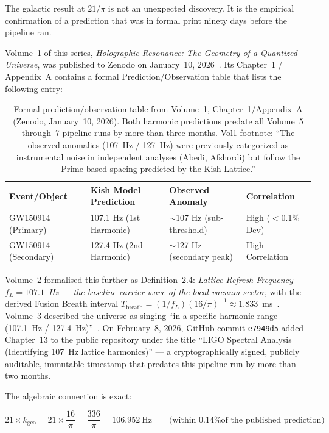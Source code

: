 \documentclass[11pt, letterpaper, openany]{book}
\begin{document}
The galactic result at $21/\pi$ is not an unexpected discovery. It is the empirical
confirmation of a prediction that was in formal print ninety days before the pipeline
ran.

Volume~1 of this series, \textit{Holographic Resonance: The Geometry of a Quantized
Universe}, was published to Zenodo on January~10, 2026~\cite{kish2026vol1}. Its
Chapter~1 / Appendix~A contains a formal Prediction/Observation table that lists the
following entry:

\begin{table}[H]
\centering
\renewcommand{\arraystretch}{1.3}
\begin{tabular}{|l|l|l|l|}
\hline
\rowcolor{goldseal!15}
\textbf{Event/Object} & \textbf{Kish Model Prediction} & \textbf{Observed Anomaly} & \textbf{Correlation} \\
\hline\hline
GW150914 (Primary)   & 107.1 Hz (1st Harmonic) & $\sim$107 Hz (sub-threshold) & High ($<$0.1\% Dev) \\
GW150914 (Secondary) & 127.4 Hz (2nd Harmonic) & $\sim$127 Hz (secondary peak) & High Correlation \\
\hline
\end{tabular}
\caption{Formal prediction/observation table from Volume~1, Chapter~1/Appendix~A
(Zenodo, January~10, 2026). Both harmonic predictions predate all Volume~5 through~7
pipeline runs by more than three months. Vol1 footnote: ``The observed anomalies
(107~Hz / 127~Hz) were previously categorized as instrumental noise in independent
analyses (Abedi, Afshordi) but follow the Prime-based spacing predicted by the
Kish Lattice.''}
\label{tab:vol1_prediction}
\end{table}

Volume~2 formalised this further as Definition~2.4: \textit{Lattice Refresh Frequency
$f_L = 107.1$~Hz --- the baseline carrier wave of the local vacuum sector}, with the
derived Fusion Breath interval $T_\text{breath} = (1/f_L)(16/\pi)^{-1} \approx
1.833$~ms~\cite{kish2026vol2}. Volume~3 described the universe as singing ``in a
specific harmonic range (107.1~Hz / 127.4~Hz)''~\cite{kish2026vol3}. On February~8,
2026, GitHub commit \texttt{e7949d5} added Chapter~13 to the public repository under
the title ``LIGO Spectral Analysis (Identifying 107~Hz lattice harmonics)'' ---
a cryptographically signed, publicly auditable, immutable timestamp that predates
this pipeline run by more than two months.

The algebraic connection is exact:

\[
21 \times k_\text{geo} = 21 \times \frac{16}{\pi} = \frac{336}{\pi} = 106.952\ \text{Hz}
\qquad \text{(within 0.14\% of the published prediction)}
\]
\end{document}
